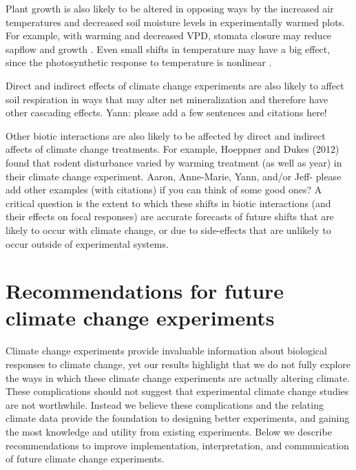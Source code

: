 \documentclass{article}
\begin{document}
\par Plant growth is also likely to be altered in opposing ways by the increased air temperatures and decreased soil moisture levels in experimentally warmed plots. For example, with warming and decreased VPD, stomata closure may reduce sapflow and growth \citep{templer2016}. Even small shifts in temperature may have a big effect, since the photosynthetic response to temperature is nonlinear \citep{berry1980}. %

\par Direct and indirect effects of climate change experiments are also likely to affect soil respiration in ways that may alter net mineralization and therefore have other cascading effects. Yann: please add a few sentences and citations here!

\par Other biotic interactions are also likely to be affected by direct and indirect affects of climate change treatments. For example, Hoeppner and Dukes  (2012) found that rodent disturbance varied by warming treatment (as well as year) in their climate change experiment. Aaron, Anne-Marie, Yann, and/or Jeff- please add other examples (with citations) if you can think of some good ones? A critical question is the extent to which these shifts in biotic interactions (and their effects on focal responses) are accurate forecasts of future shifts that are likely to occur with climate change, or due to side-effects that are unlikely to occur outside of experimental systems.

\section* {Recommendations for future climate change experiments}
 \par Climate change experiments provide invaluable information about biological responses to climate change, yet our results highlight that we do not fully explore the ways in which these climate change experiments are actually altering climate. These complications should not suggest that experimental climate change studies are not worthwhile. Instead we believe these complications and the relating climate data provide the foundation to designing better experiments, and gaining the most knowledge and utility from existing experiments. Below we describe recommendations to improve implementation, interpretation, and communication of future climate change experiments.
 
\end{document}
